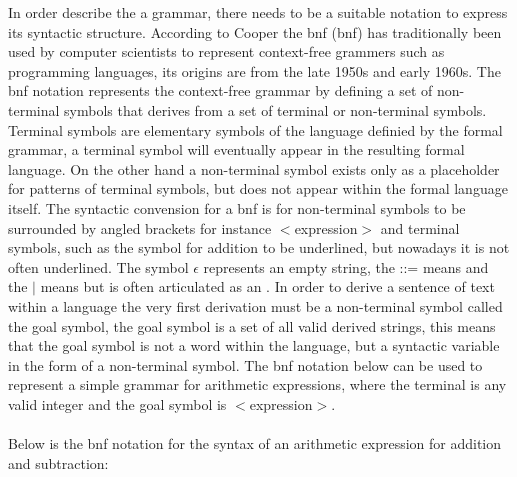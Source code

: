 In order describe the a grammar, there needs to be a suitable notation to express its syntactic structure. According to Cooper the \acrlong{bnf} (\acrshort{bnf}) has traditionally been used by computer scientists to represent context-free grammers such as programming languages, its origins are from the late 1950s and early 1960s. The \acrshort{bnf} notation represents the context-free grammar by defining a set of non-terminal symbols that derives from a set of terminal or non-terminal symbols. Terminal symbols are elementary symbols of the language definied by the formal grammar, a terminal symbol will eventually appear in the resulting formal language. On the other hand a non-terminal symbol exists only as a placeholder for patterns of terminal symbols, but does not appear within the formal language itself. The syntactic convension for a \acrshort{bnf} is for non-terminal symbols to be surrounded by angled brackets for instance $<$expression$>$ and terminal symbols, such as the symbol for addition \say{+} to be underlined, but nowadays it is not often underlined. The symbol $\epsilon$ represents an empty string, the ::= means  and the $\mid$ means  but is often articulated as an  \cite{cooper2011engineering}. In order to derive a sentence of text within a language the very first derivation must be a non-terminal symbol called the goal symbol, the goal symbol is a set of all valid derived strings, this means that the goal symbol is not a word within the language, but a syntactic variable in the form of a non-terminal symbol. The \acrshort{bnf} notation below can be used to represent a simple grammar for arithmetic expressions, where the terminal  is any valid integer and the goal symbol is $<$expression$>$.\\
\\
\noindent
Below is the \acrshort{bnf} notation for the syntax of an arithmetic expression for addition and subtraction:
\begin{algorithm}
\begin{bnf*}
		{}\\
		\\
		\\
\end{bnf*}
\end{algorithm}
\FloatBarrier

